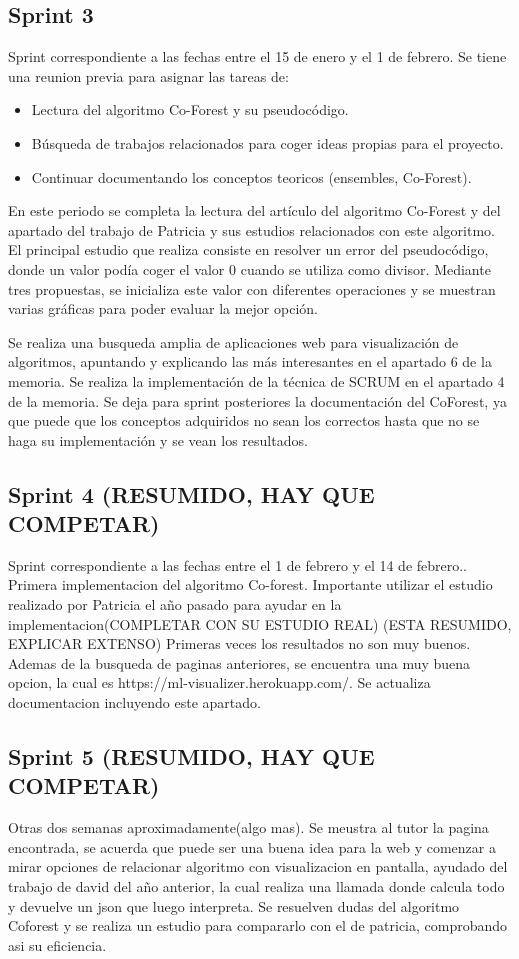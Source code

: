 \subsection{Sprint 3}
Sprint correspondiente a las fechas entre el 15 de enero y el 1 de febrero. Se tiene una reunion previa para asignar las tareas de: 
\begin{itemize}
	\item Lectura del algoritmo Co-Forest y su pseudocódigo.
	\item Búsqueda de trabajos relacionados para coger ideas propias para el proyecto.
	\item Continuar documentando los conceptos teoricos (ensembles, Co-Forest).
\end{itemize}

En este periodo se completa la lectura del artículo del algoritmo Co-Forest y del apartado del trabajo de Patricia y sus estudios relacionados con este algoritmo. El principal estudio que realiza consiste en resolver un error del pseudocódigo, donde un valor podía coger el valor 0 cuando se utiliza como divisor. Mediante tres propuestas, se inicializa este valor con diferentes operaciones y se muestran varias gráficas para poder evaluar la mejor opción.  %

Se realiza una busqueda amplia de aplicaciones web para visualización de algoritmos, apuntando y explicando las más interesantes en el apartado 6 de la memoria.
Se realiza la implementación de la técnica de SCRUM en el apartado 4 de la memoria.
Se deja para sprint posteriores la documentación del CoForest, ya que puede que los conceptos adquiridos no sean los correctos hasta que no se haga su implementación y se vean los resultados.

\subsection{Sprint 4 (RESUMIDO, HAY QUE COMPETAR)}
Sprint correspondiente a las fechas entre el 1 de febrero y el 14 de febrero.. 
Primera implementacion del algoritmo Co-forest. Importante utilizar el estudio realizado por Patricia el año pasado para ayudar en la implementacion(COMPLETAR CON SU ESTUDIO REAL)%
(ESTA RESUMIDO, EXPLICAR EXTENSO)
Primeras veces los resultados no son muy buenos. Ademas de la busqueda de paginas anteriores, se encuentra una muy buena opcion, la cual es https://ml-visualizer.herokuapp.com/. Se actualiza documentacion incluyendo este apartado.

\subsection{Sprint 5 (RESUMIDO, HAY QUE COMPETAR)}
Otras dos semanas aproximadamente(algo mas). Se meustra al tutor la pagina encontrada, se acuerda que puede ser una buena idea para la web y comenzar a mirar opciones de relacionar algoritmo con visualizacion en pantalla, ayudado del trabajo de david del año anterior, la cual realiza una llamada donde calcula todo y devuelve un json que luego interpreta. Se resuelven dudas del algoritmo Coforest y se realiza un estudio para compararlo con el de patricia, comprobando asi su eficiencia.

